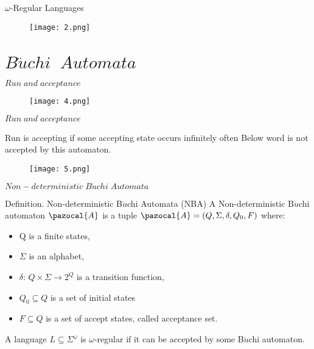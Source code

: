 \documentclass[17pt, t, lualatex]{beamer}
\begin{document}
\begin{frame}{$\omega$-Regular Languages}
    \begin{figure}
        \centering
        \texttt{[image: 2.png]}
    \end{figure}
\end{frame}

\section{$B\ddot{u}chi\;\; Automata$}

\insertsectionpage

\begin{frame}{$Run\;and\;acceptance$}
\begin{figure}
    \centering
    \texttt{[image: 4.png]}
\end{figure}
\end{frame}

\begin{frame}{$Run\;and\;acceptance$}
\begin{block}{Run is accepting if some accepting state occurs infinitely often}
Below word is not accepted by this automaton.
\begin{figure}
    \centering
    \texttt{[image: 5.png]}
\end{figure}
\end{block}
\end{frame}

\begin{frame}{$Non-deterministic\; B\ddot{u}chi\; Automata$}
\begin{block}{Definition. Non-deterministic B$\ddot{u}$chi Automata (NBA)}
A Non-deterministic B$\ddot{u}$chi automaton $\pazocal{A}$ is a tuple $\pazocal{A} = (Q, \Sigma, \delta, Q_0, F)$ where:
\begin{itemize}
    \item Q is a finite states,
    \item $\Sigma$ is an alphabet,
    \item $\delta$: $Q \times \Sigma \rightarrow 2^Q$ is a transition function,
    \item $Q_0 \subseteq Q$ is a set of initial states 
    \item $F \subseteq Q$ is a set of accept states, called acceptance set.
    
\end{itemize}
A language $L \subseteq \Sigma^{\omega}$ is $\omega$-regular if it can be accepted by some B$\ddot{u}$chi automaton.
\end{block}
\end{frame}
\end{document}
